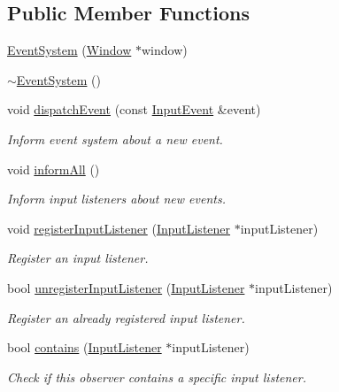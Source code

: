 \subsection*{Public Member Functions}
\begin{DoxyCompactItemize}
\item 
\mbox{\hyperlink{classec_1_1_event_system_aebdeca9447afa113154fb2bab35c274c}{Event\+System}} (\mbox{\hyperlink{classec_1_1_window}{Window}} $\ast$window)
\item 
\mbox{\hyperlink{classec_1_1_event_system_ab67b98ebb182137fb1f380ee5289d1e8}{$\sim$\+Event\+System}} ()
\item 
void \mbox{\hyperlink{classec_1_1_event_system_a97cde1bf5a2f1f8e5982b4d9e5e62187}{dispatch\+Event}} (const \mbox{\hyperlink{structec_1_1_input_event}{Input\+Event}} \&event)
\begin{DoxyCompactList}\small\item\em Inform event system about a new event. \end{DoxyCompactList}\item 
void \mbox{\hyperlink{classec_1_1_event_system_a45e41343c01e736a818c642696140632}{inform\+All}} ()
\begin{DoxyCompactList}\small\item\em Inform input listeners about new events. \end{DoxyCompactList}\item 
void \mbox{\hyperlink{classec_1_1_event_system_a179422c96238019204eccd00f8662c01}{register\+Input\+Listener}} (\mbox{\hyperlink{classec_1_1_input_listener}{Input\+Listener}} $\ast$input\+Listener)
\begin{DoxyCompactList}\small\item\em Register an input listener. \end{DoxyCompactList}\item 
bool \mbox{\hyperlink{classec_1_1_event_system_a6b76350de7e412e8df412b8c5bfd5b03}{unregister\+Input\+Listener}} (\mbox{\hyperlink{classec_1_1_input_listener}{Input\+Listener}} $\ast$input\+Listener)
\begin{DoxyCompactList}\small\item\em Register an already registered input listener. \end{DoxyCompactList}\item 
bool \mbox{\hyperlink{classec_1_1_event_system_a0df83c331a79a7dfdaa9e48920d24c9f}{contains}} (\mbox{\hyperlink{classec_1_1_input_listener}{Input\+Listener}} $\ast$input\+Listener)
\begin{DoxyCompactList}\small\item\em Check if this observer contains a specific input listener. \end{DoxyCompactList}\item 

\end{DoxyCompactItemize}
